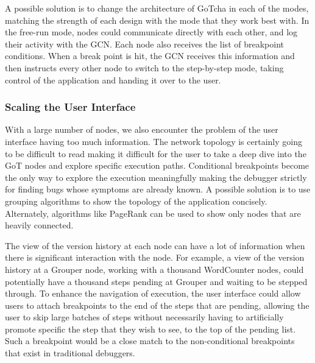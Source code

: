A possible solution is to change the architecture of GoTcha in each of the modes, matching the strength of each design with the mode that they work best with. In the free-run mode, nodes could communicate directly with each other, and log their activity with the GCN. Each node also receives the list of breakpoint conditions. When a break point is hit, the GCN receives this information and then instructs every other node to switch to the step-by-step mode, taking control of the application and handing it over to the user. 


\subsubsection{Scaling the User Interface}
With a large number of nodes, we also encounter the problem of the user interface having too much information. The network topology is certainly going to be difficult to read making it difficult for the user to take a deep dive into the GoT nodes and explore specific execution paths. Conditional breakpoints become the only way to explore the execution meaningfully making the debugger strictly for finding bugs whose symptoms are already known. A possible solution is to use grouping algorithms to show the topology of the application concisely. Alternately, algorithms like PageRank can be used to show only nodes that are heavily connected.

The view of the version history at each node can have a lot of information when there is significant interaction with the node. For example, a view of the version history at a Grouper node, working with a thousand WordCounter nodes, could potentially have a thousand steps pending at Grouper and waiting to be stepped through. To enhance the navigation of execution, the user interface could allow users to attach breakpoints to the end of the steps that are pending, allowing the user to skip large batches of steps without necessarily having to artificially promote specific the step that they wish to see, to the top of the pending list. Such a breakpoint would be a close match to the non-conditional breakpoints that exist in traditional debuggers.

